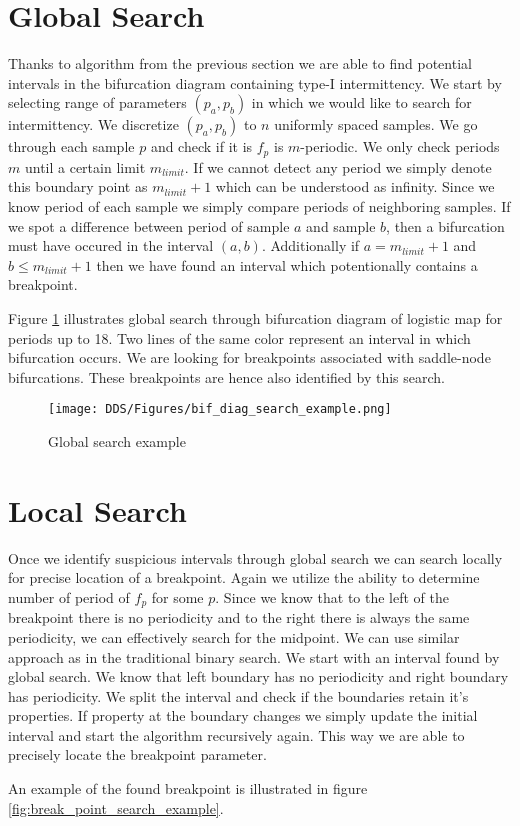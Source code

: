 \section{Global Search}
Thanks to algorithm from the previous section we are able to find potential intervals in the bifurcation diagram containing type-I intermittency.
We start by selecting range of parameters $(p_a, p_b)$ in which we would like to search for intermittency.
We discretize $(p_a, p_b)$ to $n$ uniformly spaced samples.
We go through each sample $p$ and check if it is $f_p$ is $m$-periodic.
We only check periods $m$ until a certain limit $m_{limit}$.
If we cannot detect any period we simply denote this boundary point as $m_{limit}+1$ which can be understood as infinity.
Since we know period of each sample we simply compare periods of neighboring samples.
If we spot a difference between period of sample $a$ and sample $b$, then a bifurcation must have occured in the interval $(a, b)$.
Additionally if $a=m_{limit}+1$ and $b \leq m_{limit}+1$ then we have found an interval which potentionally contains a breakpoint.
\par
Figure \ref{fig:bif_diag_search_example} illustrates global search through bifurcation diagram of logistic map for periods up to 18.
Two lines of the same color represent an interval in which bifurcation occurs.
We are looking for breakpoints associated with saddle-node bifurcations.
These breakpoints are hence also identified by this search.

\begin{figure}[!h]
    \centering
    \texttt{[image: DDS/Figures/bif\_diag\_search\_example.png]}
    \caption{Global search example}
    \label{fig:bif_diag_search_example}
\end{figure}

\section{Local Search}
Once we identify suspicious intervals through global search we can search locally for precise location of a breakpoint.
Again we utilize the ability to determine number of period of $f_p$ for some $p$.
Since we know that to the left of the breakpoint there is no periodicity and to the right there is always the same periodicity, we can effectively search for the midpoint.
We can use similar approach as in the traditional binary search.
We start with an interval found by global search.
We know that left boundary has no periodicity and right boundary has periodicity.
We split the interval and check if the boundaries retain it's properties.
If property at the boundary changes we simply update the initial interval and start the algorithm recursively again.
This way we are able to precisely locate the breakpoint parameter.
\par
An example of the found breakpoint is illustrated in figure \ref{fig:break_point_search_example}.

